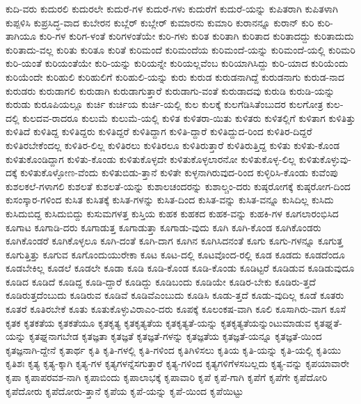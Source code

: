 {ಕುದಿ-ವರು
ಕುದುರಲಿ
ಕುದುರಲೇ
ಕುದುರೆ-ಗಳ
ಕುದುರೆ-ಗಳು
ಕುದುರೆಗೆ
ಕುದುರೆ-ಯನ್ನು
ಕುಪಿತರಾಗಿ
ಕುಪಿತಳಾಗಿ
ಕುಪ್ಪಳಿಸಿ
ಕುಪ್ರಸಿದ್ಧ-ವಾದ
ಕುಬೇರನ
ಕುಬ್ಲೆರ್
ಕುಬ್ಲೇರ್
ಕುಮಾರನು
ಕುಮಾರಿ
ಕುರಾನನ್ನೂ
ಕುರಾನ್
ಕುರಿ
ಕುರಿ-ತಾಗಿಯೂ
ಕುರಿ-ಗಳ
ಕುರಿಗ-ಳಂತೆ
ಕುರಿಗಳಂತೆಯೇ
ಕುರಿ-ಗಳು
ಕುರಿತ
ಕುರಿತಾಗಿ
ಕುರಿತಾದ
ಕುರಿತಾದದ್ದು
ಕುರಿತಾದುದು
ಕುರಿತಾದು-ವಲ್ಲ
ಕುರಿತು
ಕುರಿತೂ
ಕುರಿತೆ
ಕುರಿಮಂದೆ
ಕುರಿಮಂದೆಯ
ಕುರಿಮಂದೆ-ಯನ್ನು
ಕುರಿಮಂದೆ-ಯಲ್ಲಿ
ಕುರಿಮರಿ
ಕುರಿ-ಯಂತೆ
ಕುರಿಯಂತೆಯೇ
ಕುರಿ-ಯನ್ನು
ಕುರಿಯನ್ನೇ
ಕುರಿಯಲ್ಲವೆಂಬ
ಕುರಿಯಾಗಿಸಿದ್ದು
ಕುರಿ-ಯಾದ
ಕುರಿಯೆಂದು
ಕುರಿಯೆಂದೇ
ಕುರಿಹುಲಿ
ಕುರಿಹುಲಿಗೆ
ಕುರಿಹುಲಿ-ಯನ್ನು
ಕುರು
ಕುರುಡ
ಕುರುಡನಾಗಿದ್ದೆ
ಕುರುಡನಾಗು
ಕುರುಡ-ನಾದ
ಕುರುಡರು
ಕುರುಡಾಗಲಿ
ಕುರುಡಾಗಿ
ಕುರುಡಾಗುತ್ತಾರೆ
ಕುರುಡಾಗು-ವಂತೆ
ಕುರುಡಾದವು
ಕುರುಡಿ
ಕುರುಡಿ-ಯನ್ನು
ಕುರುಡು
ಕುರೂಪಿಯಲ್ಲೂ
ಕುರ್ಚಿ
ಕುರ್ಚಿಯ
ಕುರ್ಚಿ-ಯಲ್ಲಿ
ಕುಲ
ಕುಲಕ್ಕೆ
ಕುಲಗೆಡಿಸಿತೆಂಬುದರ
ಕುಲಗೋತ್ರ
ಕುಲ-ದಲ್ಲಿ
ಕುಲದವ-ರಾದರೂ
ಕುಲುಮೆ
ಕುಲುಮೆ-ಯಲ್ಲಿ
ಕುಳಿತ
ಕುಳಿತರಾ-ಯಿತು
ಕುಳಿತರು
ಕುಳಿತಲ್ಲಿಗೆ
ಕುಳಿತಾಗ
ಕುಳಿತಿತ್ತು
ಕುಳಿತಿದೆ
ಕುಳಿತಿದ್ದ
ಕುಳಿತಿದ್ದರು
ಕುಳಿತಿದ್ದರೆ
ಕುಳಿತಿದ್ದಾಗ
ಕುಳಿತಿ-ದ್ದಾರೆ
ಕುಳಿತಿದ್ದುದ-ರಿಂದ
ಕುಳಿತಿರ-ದಿದ್ದರೆ
ಕುಳಿತಿರಬೇಕೆಂದಲ್ಲ
ಕುಳಿತಿರ-ಲಿಲ್ಲ
ಕುಳಿತಿರಲು
ಕುಳಿತಿರಲೂ
ಕುಳಿತಿರುತ್ತಾರೆ
ಕುಳಿತಿರುತ್ತಿದ್ದ
ಕುಳಿತು
ಕುಳಿತು-ಕೊಂಡ
ಕುಳಿತುಕೊಂಡಿದ್ದಾಗ
ಕುಳಿತು-ಕೊಂಡು
ಕುಳಿತುಕೊಳ್ಳದೇ
ಕುಳಿತುಕೊಳ್ಳಲಾರನೋ
ಕುಳಿತುಕೊಳ್ಳ-ಲಿಲ್ಲ
ಕುಳಿತುಕೊಳ್ಳುವು-ದಕ್ಕೆ
ಕುಳಿತುಕೊಳ್ಳೋಣ-ವೆಂದು
ಕುಳಿತುಬಿಡು-ತ್ತಾನೆ
ಕುಳಿತೇ
ಕುಳ್ಳನಾಗಿರುವುದ-ರಿಂದ
ಕುಳ್ಳಿರಿಸಿ-ಕೊಂಡು
ಕುವೆಂಪು
ಕುಶಲಕಲೆ-ಗಳಾಗಲಿ
ಕುಶಲತೆ
ಕುಶಲತೆ-ಯನ್ನು
ಕುಶಾಲಚಂದರನ್ನು
ಕುಶಾಲ್ಚಂ-ದರು
ಕುಷ್ಠರೋಗಕ್ಕೆ
ಕುಷ್ಠರೋಗ-ದಿಂದ
ಕುಸಂಸ್ಕಾರ-ಗಳಿಂದ
ಕುಸಿತ
ಕುಸಿತಕ್ಕೆ
ಕುಸಿತ-ಗಳನ್ನು
ಕುಸಿತ-ದಿಂದ
ಕುಸಿತ-ವನ್ನು
ಕುಸಿತ-ವನ್ನೂ
ಕುಸಿದಿಲ್ಲ
ಕುಸಿದು
ಕುಸಿದುಬಿದ್ದ
ಕುಸಿದುಬಿದ್ದು
ಕುಸುಮಗಳತ್ತ
ಕುಸ್ತಿಯ
ಕುಹಕ
ಕುಹಕದ
ಕುಹಕ-ವನ್ನು
ಕುಹಕಿ-ಗಳ
ಕೂಗಲಾರಂಭಿಸಿದ
ಕೂಗಾಟ
ಕೂಗಾಡಿ-ದರು
ಕೂಗಾಡುತ್ತ
ಕೂಗಾಡುತ್ತಾ
ಕೂಗಾಡು-ವುದು
ಕೂಗಿ
ಕೂಗಿ-ಕೊಂಡ
ಕೂಗಿಕೊಂಡರು
ಕೂಗಿಕೊಂಡರೆ
ಕೂಗಿಕೊಳ್ಳಲೂ
ಕೂಗಿ-ದಂತೆ
ಕೂಗಿ-ದಾಗ
ಕೂಗಿನ
ಕೂಗಿಸಿದನಂತೆ
ಕೂಗು
ಕೂಗು-ಗಳನ್ನೂ
ಕೂಗುತ್ತ
ಕೂಗುತ್ತಿತ್ತು
ಕೂಗುವ
ಕೂಗೊಂದುಯುರೇಕಾ
ಕೂಟ
ಕೂಟ-ದಲ್ಲಿ
ಕೂಟವೊಂದ-ರಲ್ಲಿ
ಕೂಡ
ಕೂಡದು
ಕೂಡದೆಂದೂ
ಕೂಡಬೇಕಿಲ್ಲ
ಕೂಡಲೆ
ಕೂಡಲೇ
ಕೂಡಾ
ಕೂಡಿ
ಕೂಡಿ-ಕೊಂಡ
ಕೂಡಿ-ಕೊಂಡು
ಕೂಡಿಟ್ಟರೆ
ಕೂಡಿಡುವ
ಕೂಡಿಡುವುದೂ
ಕೂಡಿದ
ಕೂಡಿದೆ
ಕೂಡಿದ್ದ
ಕೂಡಿ-ದ್ದಾರೆ
ಕೂಡಿದ್ದು
ಕೂಡಿಬಂದು
ಕೂಡಿಯೇ
ಕೂಡಿರ-ಬೇಕು
ಕೂಡಿರು-ತ್ತದೆ
ಕೂಡಿರುತ್ತದೆಂಬುದು
ಕೂಡಿರುವ
ಕೂಡಿವೆ
ಕೂಡಿವೆಎಂಬುದು
ಕೂಡಿಸಿ
ಕೂಡು-ತ್ತದೆ
ಕೂಡು-ವುದಿಲ್ಲ
ಕೂಡೆ
ಕೂತರು
ಕೂತರೆ
ಕೂತಿರಬೇಕೆ
ಕೂತು
ಕೂತುಕೊಳ್ಳುವಿರಾಎಂ-ದರು
ಕೂಪಕ್ಕೆ
ಕೂಲಂಕಷ-ವಾಗಿ
ಕೂಲಿ
ಕೂಸಾಗಿರು-ವಾಗ
ಕೂಸೆ
ಕೃತಕ
ಕೃತಕತೆಯ
ಕೃತಕತೆಯೂ
ಕೃತಕೃತ್ಯ
ಕೃತಕೃತ್ಯತೆಯ
ಕೃತಕೃತ್ಯತೆ-ಯನ್ನು
ಕೃತಕೃತ್ಯತೆಯನ್ನುಂಟುಮಾಡುವ
ಕೃತಘ್ನತೆ-ಯನ್ನು
ಕೃತಘ್ನನಾಗಬೇಡ
ಕೃತಜ್ಞತಾ
ಕೃತಜ್ಞತೆ
ಕೃತಜ್ಞತೆ-ಗಳನ್ನು
ಕೃತಜ್ಞತೆಯ
ಕೃತಜ್ಞತೆ-ಯನ್ನೂ
ಕೃತಜ್ಞತೆ-ಯಿಂದ
ಕೃತಜ್ಞನಾಗಿ-ದ್ದೇನೆ
ಕೃತಾರ್ಥ
ಕೃತಿ
ಕೃತಿ-ಗಳಲ್ಲಿ
ಕೃತಿ-ಗಳಿಂದ
ಕೃತಿಗಿಳಿಸಲು
ಕೃತಿಯ
ಕೃತಿ-ಯನ್ನು
ಕೃತಿ-ಯಲ್ಲಿ
ಕೃತಿಯು
ಕೃತಿಶಃ
ಕೃತ್ಯ
ಕೃತ್ಯ-ಕ್ಕಾಗಿ
ಕೃತ್ಯ-ಗಳ
ಕೃತ್ಯಗಳನ್ನೆಸಗುತ್ತಾರೆ
ಕೃತ್ಯ-ಗಳಿಂದ
ಕೃತ್ಯಗಳಿಗೆಳಸಬಲ್ಲದು
ಕೃತ್ಯ-ವನ್ನು
ಕೃಪಯಾವಾರೇ
ಕೃಪಾ
ಕೃಪಾಪರವಶ-ನಾಗಿ
ಕೃಪಾಬಿಂದು
ಕೃಪಾಲಾಭಕ್ಕೆ
ಕೃಪಾವಾರಿ
ಕೃಪೆ
ಕೃಪೆ-ಗಾಗಿ
ಕೃಪೆಗೆ
ಕೃಪೆಗೇ
ಕೃಪೆದೋರಿ
ಕೃಪೆದೋರು
ಕೃಪೆದೋರು-ತ್ತಾನೆ
ಕೃಪೆಯ
ಕೃಪೆ-ಯನ್ನು
ಕೃಪೆ-ಯಿಂದ
ಕೃಪೆಯಿಟ್ಟು
}
